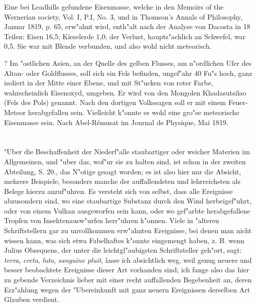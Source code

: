 \documentclass[a4paper, 11pt, oneside, polutonikogreek, german]{article}
\begin{document}
Eine bei Leadhills gefundene Eisenmasse, welche in den Memoirs of the Wernerian society, Vol. I, P.I, No. 3, und in Thomson's Annals of Philosophy, Januar 1819, p. 65, erw"ahnt wird, enth"alt nach der Analyse von Dacosta in 18 Teilen: Eisen 16,5; Kieselerde 1,0; der Verlust, haupts"achlich an Schwefel, war 0,5. Sie war mit Blende verbunden, und also wohl nicht meteorisch.

? Im "ostlichen Asien, an der Quelle des gelben Flusses, am n"ordlichen Ufer des Altan- oder Goldflusses, soll sich ein Fels befinden, ungef"ahr 40 Fu"s hoch, ganz isoliert in der Mitte einer Ebene, und mit St"ucken von roter Farbe, wahrscheinlich Eisenoxyd, umgeben. Er wird von den Mongolen Khadasutsilao (Fels des Pols) genannt. Nach den dortigen Volkssagen soll er mit einem Feuer-Meteor herabgefallen sein. Vielleicht k"onnte es wohl eine gro"se meteorische Eisenmasse sein. Nach Abel-Rémusat im Journal de Physique, Mai 1819.
\clearpage
\section{}
\paragraph{}
"Uber die Beschaffenheit der Niederf"alle staubartiger oder weicher Materien im Allgemeinen, und "uber das, wof"ur sie zu halten sind, ist schon in der zweiten Abteilung, S. 20., das N"otige gesagt worden; es ist also hier nur die Absicht, mehrere Beispiele, besonders manche der auffallendsten und lehrreichsten als Belege hierzu anzuf"uhren. Es versteht sich von selbst, dass alle Ereignisse abzusondern sind, wo eine staubartige Substanz durch den Wind herbeigef"uhrt, oder von einem Vulkan ausgeworfen sein kann, oder wo gef"arbte herabgefallene Tropfen von Insektenausw"urfen herr"uhren k"onnen. Viele in "alteren Schriftstellern gar zu unvollkommen erw"ahnten Ereignisse, bei denen man nicht wissen kann, was sich etwa Fabelhaftes k"onnte eingemengt haben, z. B. wenn Julius Obsequens, der unter die leichtgl"aubigsten Schriftsteller geh"ort, sagt: \emph{terra}, \emph{creta}, \emph{luto}, \emph{sanguine pluit}, lasse ich absichtlich weg, weil genug neuere und besser beobachtete Ereignisse dieser Art vorhanden sind; ich fange also das hier zu gebende Verzeichnis lieber mit einer recht auffallenden Begebenheit an, deren Erz"ahlung wegen der "Ubereinkunft mit ganz neuern Ereignissen derselben Art Glauben verdient.
\end{document}
